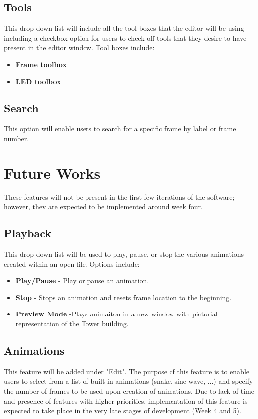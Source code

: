 \documentclass[preprint,12pt]{article}
\begin{document}
\subsection{Tools}

{This drop-down list will include all the tool-boxes that the editor will be using including a checkbox option for users to check-off tools that they desire to have present in the editor window. Tool boxes include:}

\begin{itemize}
\item \textbf{Frame toolbox}
\item \textbf{LED toolbox}

\end{itemize}

\subsection{Search}

{This option will enable users to search for a specific frame by label or frame number.}

\section{Future Works}

{These features will not be present in the first few iterations of the software; however, they are expected to be implemented around week four. }

\subsection{Playback}

{This drop-down list will be used to play, pause, or stop the various animations created within an open file. Options include: }
\begin{itemize}
\item \textbf{Play/Pause} - Play or pause an animation.
\item \textbf{Stop} - Stops an animation and resets frame location to the beginning.
\item \textbf{Preview Mode} -Plays animaiton in a new window with pictorial representation of the Tower building.

\end{itemize}

\subsection{Animations}

{This feature will be added under "Edit". The purpose of this feature is to enable users to select from a list of built-in animations (snake, sine wave, ...) and specify the number of frames to be used upon creation of animations. Due to lack of time and presence of features with higher-priorities, implementation of this feature is expected to take place in the very late stages of development (Week 4 and 5). }
\end{document}
